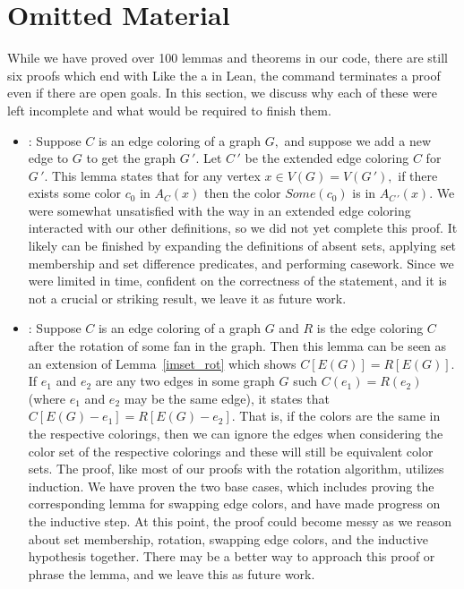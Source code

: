 \section{Omitted Material}\label{section admit it} 
While we have proved over 100 lemmas and theorems in our code, there are still six proofs which end with  Like the a  in Lean, the  command terminates a proof even if there are open goals. In this section, we discuss why each of these were left incomplete and what would be required to finish them.
\begin{itemize}
    \item \textit{}: Suppose $C$ is an edge coloring of a graph $G,$ and suppose we add a new edge to $G$ to get the graph $G\,'.$ Let $C\,'$ be the extended edge coloring $C$ for $G\,'.$ This lemma states that for any vertex $x \in V(G) = V(G\,'),$ if there exists some color $c_0$ in $A_C(x)$ then the color $Some(c_0)$ is in $A_{C\,'}(x).$ We were somewhat unsatisfied with the way in an extended edge coloring interacted with our other definitions, so we did not yet complete this proof. It likely can be finished by expanding the definitions of absent sets, applying set membership and set difference predicates, and performing casework. Since we were limited in time, confident on the correctness of the statement, and it is not a crucial or striking result, we leave it as future work.
    \item \textit{}: Suppose $C$ is an edge coloring of a graph $G$ and $R$ is the edge coloring $C$ after the rotation of some fan in the graph. Then this lemma can be seen as an extension of Lemma~\ref{imset_rot} which shows $C[E(G)] = R[E(G)]$. If $e_1$ and $e_2$ are any two edges in some graph $G$ such $C(e_1) = R(e_2)$ (where $e_1$ and $e_2$ may be the same edge), it states that $C[E(G) - e_1] = R[E(G) - e_2].$ That is, if the colors are the same in the respective colorings, then we can ignore the edges when considering the color set of the respective colorings and these will still be equivalent color sets. The proof, like most of our proofs with the rotation algorithm, utilizes induction. We have proven the two base cases, which includes proving the corresponding lemma for swapping edge colors, and have made progress on the inductive step. At this point, the proof could become messy as we reason about set membership, rotation, swapping edge colors, and the inductive hypothesis together. There may be a better way to approach this proof or phrase the lemma, and we leave this as future work.

\end{itemize}
